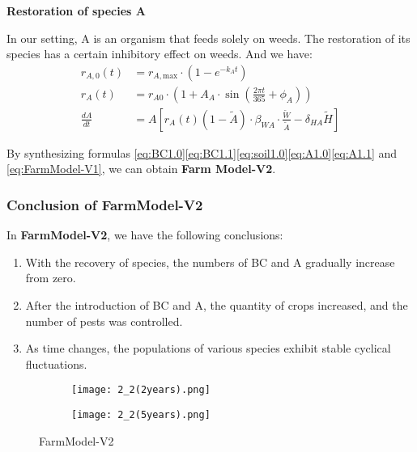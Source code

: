 \documentclass[12pt]{article}  %
\begin{document}
\noindent\textbf{Restoration of species A}

In our setting, A is an organism that feeds solely on weeds. 
The restoration of its species has a certain inhibitory effect on weeds.
And we have:
\begin{align}
    r_{A,0}(t) &= r_{A,\text{max}} \cdot \left(1 - e^{-k_A t}\right)\\
    r_A(t) &= r_{A0} \cdot \left(1 + A_A \cdot \sin\left(\frac{2\pi t}{365} + \phi_A\right)\right) \label{eq:A1.0} \\
    \frac{dA}{dt} &= A \left[ r_A(t) \left( 1 - \tilde{A} \right) \cdot \beta_{WA} \cdot \frac{\tilde{W}}{\tilde{A}} - \delta_{HA} \tilde{H} \right]\label{eq:A1.1}
\end{align}

By synthesizing formulas \eqref{eq:BC1.0}\eqref{eq:BC1.1}\eqref{eq:soil1.0}\eqref{eq:A1.0}\eqref{eq:A1.1} and \eqref{eq:FarmModel-V1}, we can obtain \textbf{Farm
Model-V2}.

\subsubsection{Conclusion of FarmModel-V2}
In \textbf{FarmModel-V2}, we have the following conclusions:

\begin{enumerate}
    \item With the recovery of species, the numbers of BC 
    and A gradually increase from zero.
    \item After the introduction of BC and A, the 
    quantity of crops increased, and the number of 
    pests was controlled.
    \item As time changes, the populations of various 
    species exhibit stable cyclical fluctuations.
\end{enumerate}

\begin{figure}[h]
    \centering
    \begin{subfigure}[b]{.4\textwidth}
        \texttt{[image: 2\_2(2years).png]}
        \label{subfigure:2-2(2years)}
    \end{subfigure}
    \begin{subfigure}[b]{.4\textwidth}
        \texttt{[image: 2\_2(5years).png]}
        \label{subfig:2-2(5years)}
    \end{subfigure}
    \caption{FarmModel-V2}\label{fig:FarmModel-V2}
    \end{figure}
\end{document}
